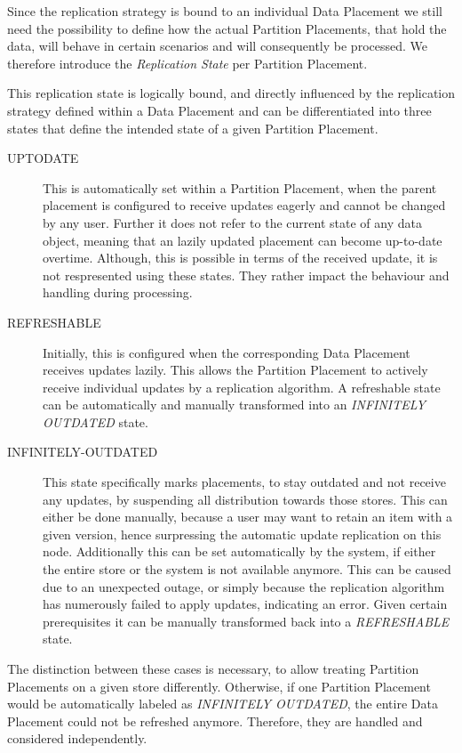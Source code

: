 Since the replication strategy is bound to an individual Data Placement we still need the possibility to 
define how the actual Partition Placements, that hold the data, will behave in certain scenarios and will consequently be processed.
We therefore introduce the \emph{Replication State} per Partition Placement.

This replication state is logically bound, and directly influenced by the replication strategy defined within a Data Placement
and can be differentiated into three states that define the intended state of a given Partition Placement. 
\begin{description}
    \item [UPTODATE] This is automatically set within a Partition Placement, when the parent placement is configured to receive updates eagerly and cannot be changed by any user. 
    Further it does not refer to the current state of any data object, meaning that an lazily updated placement can become up-to-date overtime.
    Although, this is possible in terms of the received update, it is not respresented using these states. They rather impact the behaviour and handling during processing.
    
    \item [REFRESHABLE] Initially, this is configured when the corresponding Data Placement receives updates lazily. This allows the Partition Placement to actively receive 
    individual updates by a replication algorithm. A refreshable state can be automatically and manually transformed into an \emph{INFINITELY OUTDATED} state.

    \item [INFINITELY-OUTDATED] This state specifically marks placements, to stay outdated and not receive any updates, by suspending all distribution towards those stores.
    This can either be done manually, because a user may want to
    retain an item with a given version, hence surpressing the automatic update replication on this node. Additionally this can be set automatically by the system, 
    if either the entire store or the system is not available anymore. This can be caused due to an unexpected outage, or simply because the replication algorithm has 
    numerously failed to apply updates, indicating an error. Given certain prerequisites it can be manually transformed back into a \emph{REFRESHABLE} state.

\end{description}

The distinction between these cases is necessary, to allow treating Partition Placements on a given store differently. 
Otherwise, if one Partition Placement would be automatically labeled as \emph{INFINITELY OUTDATED}, the entire Data Placement could not be refreshed anymore.
Therefore, they are handled and considered independently.

